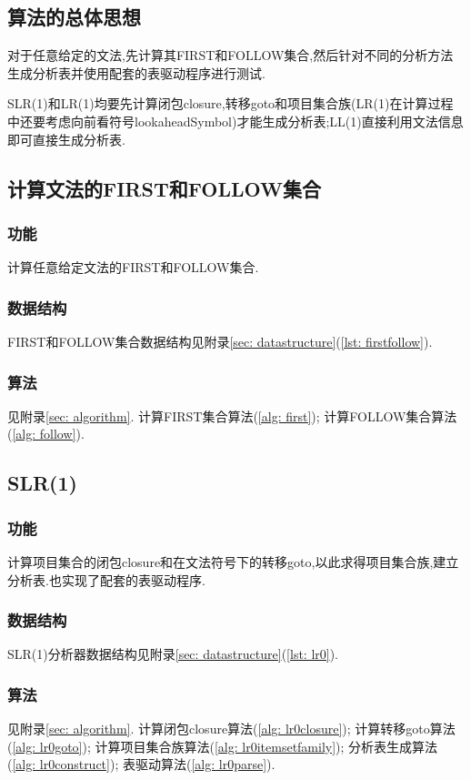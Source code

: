 \documentclass[11pt]{article}
\begin{document}
\subsection{算法的总体思想}
对于任意给定的文法,先计算其FIRST和FOLLOW集合,然后针对不同的分析方法生成分析表并使用配套的表驱动程序进行测试.

SLR(1)和LR(1)均要先计算闭包closure,转移goto和项目集合族(LR(1)在计算过程中还要考虑向前看符号lookaheadSymbol)才能生成分析表;LL(1)直接利用文法信息即可直接生成分析表.

\subsection{计算文法的FIRST和FOLLOW集合}
\subsubsection{功能}
计算任意给定文法的FIRST和FOLLOW集合.

\subsubsection{数据结构}
FIRST和FOLLOW集合数据结构见附录\ref{sec: datastructure}(\ref{lst: firstfollow}).

\subsubsection{算法}
见附录\ref{sec: algorithm}.
计算FIRST集合算法(\ref{alg: first});
计算FOLLOW集合算法(\ref{alg: follow}).

\subsection{SLR(1)}
\subsubsection{功能}
计算项目集合的闭包closure和在文法符号下的转移goto,以此求得项目集合族,建立分析表.也实现了配套的表驱动程序.

\subsubsection{数据结构}
SLR(1)分析器数据结构见附录\ref{sec: datastructure}(\ref{lst: lr0}).

\subsubsection{算法}
见附录\ref{sec: algorithm}.
计算闭包closure算法(\ref{alg: lr0closure});
计算转移goto算法(\ref{alg: lr0goto});
计算项目集合族算法(\ref{alg: lr0itemsetfamily});
分析表生成算法(\ref{alg: lr0construct});
表驱动算法(\ref{alg: lr0parse}).
\end{document}
